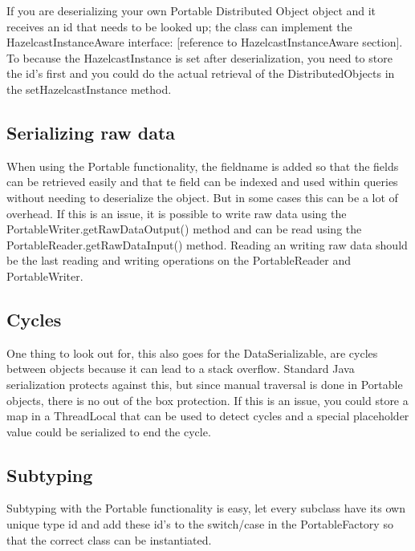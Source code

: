 If you are deserializing your own Portable Distributed Object object and it receives an id that needs to be looked up; the class can implement the HazelcastInstanceAware interface: [reference to HazelcastInstanceAware section]. To because the HazelcastInstance is set after deserialization, you need to store the id's first and you could do the actual retrieval of the DistributedObjects in the setHazelcastInstance method.

\subsection{Serializing raw data}
When using the Portable functionality, the fieldname is added so that the fields can be retrieved easily and that te field can be indexed and used within queries without needing to deserialize the object. But in some cases this can be a lot of overhead. If this is an issue, it is possible to write raw data using the PortableWriter.getRawDataOutput() method and can be read using the PortableReader.getRawDataInput() method. Reading an writing raw data should be the last reading and writing operations on the PortableReader and PortableWriter.

\subsection*{Cycles}
One thing to look out for, this also goes for the DataSerializable, are cycles between objects because it can lead to a stack overflow. Standard Java serialization protects against this, but since manual traversal is done in Portable objects, there is no out of the box protection. If this is an issue, you could store a map in a ThreadLocal that can be used to detect cycles and a special placeholder value could be serialized to end the cycle.

\subsection*{Subtyping}
Subtyping with the Portable functionality is easy, let every subclass have its own unique type id and add these id's to the switch/case in the PortableFactory so that the correct class can be instantiated. 

